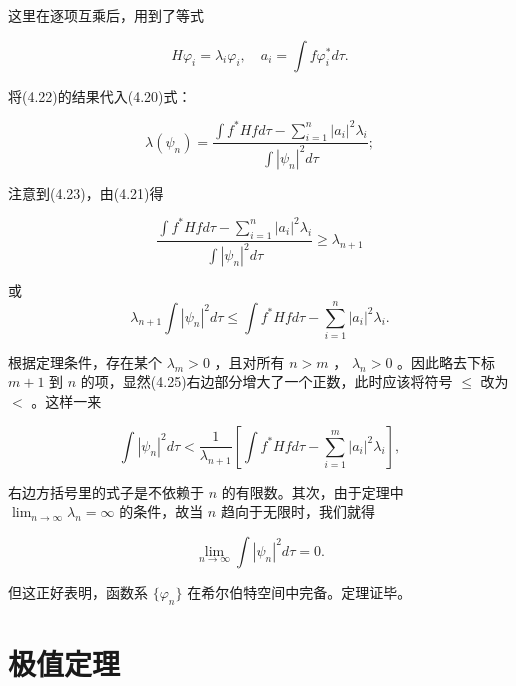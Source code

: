 这里在逐项互乘后，用到了等式

\begin{equation*}
H \varphi_ {i} = \lambda_ {i} \varphi_ {i}, \quad a _ {i} = \int f \varphi_ {i} ^ {*} d \tau .
\end{equation*}

将(4.22)的结果代入(4.20)式：

\begin{equation*}
\lambda (\psi_ {n}) = \frac {\int f ^ {*} H f d \tau - \sum_ {i = 1} ^ {n} | a _ {i} | ^ {2} \lambda_ {i}}{\int | \psi_ {n} | ^ {2} d \tau};\tag{4.23}
\end{equation*}

注意到(4.23)，由(4.21)得

\begin{equation*}
\frac {\int f ^ {*} H f d \tau - \sum_ {i = 1} ^ {n} | a _ {i} | ^ {2} \lambda_ {i}}{\int | \psi_ {n} | ^ {2} d \tau} \geqslant \lambda_ {n + 1}\tag{4.24}
\end{equation*}

或
\begin{equation*}
\lambda_ {n + 1} \int | \psi_ {n} | ^ {2} d \tau \leqslant \int f ^ {*} H f d \tau - \sum_ {i = 1} ^ {n} | a _ {i} | ^ {2} \lambda_ {i}.\tag{4.25}
\end{equation*}

根据定理条件，存在某个 $\lambda_{m} > 0$ ，且对所有 $n > m$ ， $\lambda_{n} > 0$ 。因此略去下标 $m + 1$ 到 $n$ 的项，显然(4.25)右边部分增大了一个正数，此时应该将符号 $\leqslant$ 改为 $<$ 。这样一来

\begin{equation*}
\int | \psi_ {n} | ^ {2} d \tau <   \frac {1}{\lambda_ {n + 1}} \left[ \int f ^ {*} H f d \tau - \sum_ {i = 1} ^ {m} | a _ {i} | ^ {2} \lambda_ {i} \right],\tag{4.26}
\end{equation*}

右边方括号里的式子是不依赖于 $n$ 的有限数。其次，由于定理中 $\lim_{n\to \infty}\lambda_n = \infty$ 的条件，故当 $n$ 趋向于无限时，我们就得

\begin{equation*}
\lim _ {n \rightarrow \infty} \int | \psi_ {n} | ^ {2} d \tau = 0.\tag{4.27}
\end{equation*}

但这正好表明，函数系 $\{\varphi_{n}\}$ 在希尔伯特空间中完备。定理证毕。

\section{极值定理}

